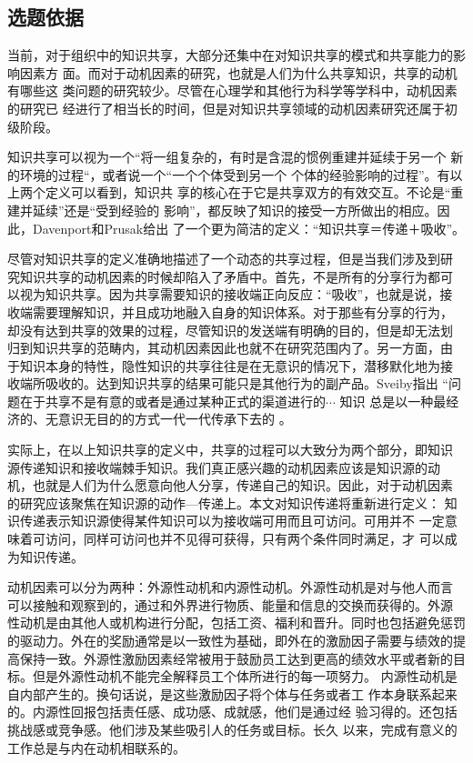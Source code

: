 \documentclass[12pt,a4paper]{ctexart}
\begin{document}
\subsection{选题依据}
当前，对于组织中的知识共享，大部分还集中在对知识共享的模式和共享能力的影响因素方
面。而对于动机因素的研究，也就是人们为什么共享知识，共享的动机有哪些这
类问题的研究较少。尽管在心理学和其他行为科学等学科中，动机因素的研究已
经进行了相当长的时间，但是对知识共享领域的动机因素研究还属于初级阶段。

知识共享可以视为一个“将一组复杂的，有时是含混的惯例重建并延续于另一个
新的环境的过程“\cite{szulanski2000pkt}，或者说一个“一个个体受到另一个
个体的经验影响的过程”\cite{Argote2000}。有以上两个定义可以看到，知识共
享的核心在于它是共享双方的有效交互。不论是“重建并延续”还是“受到经验的
影响”，都反映了知识的接受一方所做出的相应。因此，Davenport和Prusak给出
了一个更为简洁的定义：“知识共享＝传递＋吸收”\cite{davenport1998wko}。

尽管对知识共享的定义准确地描述了一个动态的共享过程，但是当我们涉及到研
究知识共享的动机因素的时候却陷入了矛盾中。首先，不是所有的分享行为都可
以视为知识共享。因为共享需要知识的接收端正向反应：“吸收”，也就是说，接
收端需要理解知识，并且成功地融入自身的知识体系。对于那些有分享的行为，
却没有达到共享的效果的过程，尽管知识的发送端有明确的目的，但是却无法划
归到知识共享的范畴内，其动机因素因此也就不在研究范围内了。另一方面，由
于知识本身的特性，隐性知识的共享往往是在无意识的情况下，潜移默化地为接
收端所吸收的。达到知识共享的结果可能只是其他行为的副产品。Sveiby指出
“问题在于共享不是有意的或者是通过某种正式的渠道进行的$\cdots$ 知识
总是以一种最经济的、无意识无目的的方式一代一代传承下去的
\cite{sveiby1996tka}。

实际上，在以上知识共享的定义中，共享的过程可以大致分为两个部分，即知识
源传递知识和接收端棘手知识。我们真正感兴趣的动机因素应该是知识源的动
机，也就是人们为什么愿意向他人分享，传递自己的知识。因此，对于动机因素
的研究应该聚焦在知识源的动作---传递上。本文对知识传递将重新进行定义：
知识传递表示知识源使得某件知识可以为接收端可用而且可访问。可用并不
一定意味着可访问，同样可访问也并不见得可获得，只有两个条件同时满足，才
可以成为知识传递。

动机因素可以分为两种：外源性动机和内源性动机。外源性动机是对与他人而言
可以接触和观察到的，通过和外界进行物质、能量和信息的交换而获得的。外源
性动机是由其他人或机构进行分配，包括工资、福利和晋升。同时也包括避免惩罚的驱动力。外在的奖励通常是以一致性为基础，即外在的激励因子需要与绩效的提高保持一致。外源性激励因素经常被用于鼓励员工达到更高的绩效水平或者新的目标。但是外源性动机不能完全解释员工个体所进行的每一项努力。
 内源性动机是自内部产生的。换句话说，是这些激励因子将个体与任务或者工
 作本身联系起来的。内源性回报包括责任感、成功感、成就感，他们是通过经
 验习得的。还包括挑战感或竞争感。他们涉及某些吸引人的任务或目标。长久
 以来，完成有意义的工作总是与内在动机相联系的\cite{Luthans2001}。
\end{document}
